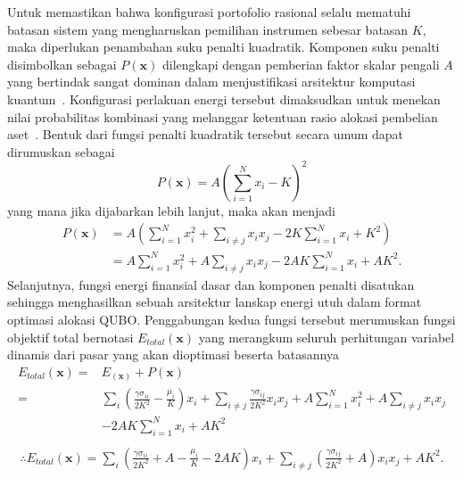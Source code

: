 Untuk memastikan bahwa konfigurasi portofolio rasional selalu mematuhi batasan sistem yang mengharuskan pemilihan instrumen sebesar batasan $K$, maka diperlukan penambahan suku penalti kuadratik. Komponen suku penalti disimbolkan sebagai $P(\mathbf{x})$ dilengkapi dengan pemberian faktor skalar pengali $A$ yang bertindak sangat dominan dalam menjustifikasi arsitektur komputasi kuantum~\cite{suzuki_spin-_2025}. Konfigurasi perlakuan energi tersebut dimaksudkan untuk menekan nilai probabilitas kombinasi yang melanggar ketentuan rasio alokasi pembelian aset~. Bentuk dari fungsi penalti kuadratik tersebut secara umum dapat dirumuskan sebagai
\begin{equation}
    P(\mathbf{x}) = A\left(\sum_{i=1}^N x_i - K\right)^2
    \label{eq:penalty_function}
\end{equation}
yang mana jika dijabarkan lebih lanjut, maka akan menjadi
\begin{equation*}
    \begin{split}
    P(\mathbf{x}) &= A\left(\sum_{i=1}^N x_i^2 + \sum_{i\ne j} x_ix_j - 2K\sum_{i=1}^N x_i + K^2\right) \\
    &= A\sum_{i=1}^N x_i^2 + A\sum_{i\ne j} x_ix_j - 2AK\sum_{i=1}^N x_i + AK^2.
    \end{split}
\end{equation*}
Selanjutnya, fungsi energi finansial dasar dan komponen penalti disatukan sehingga menghasilkan sebuah arsitektur lanskap energi utuh dalam format optimasi alokasi QUBO. Penggabungan kedua fungsi tersebut merumuskan fungsi objektif total bernotasi $E_{total}(\mathbf{x})$ yang merangkum seluruh perhitungan variabel dinamis dari pasar yang akan dioptimasi beserta batasannya
\begin{equation*}
    \begin{split}
    E_{total}(\mathbf{x}) =& E_(\mathbf{x}) + P(\mathbf{x})\\
    =& \sum_i \left(\frac{\gamma \sigma_{ii}}{2K^2} - \frac{\mu_i}{K}\right)x_i + \sum_{i\ne j}\frac{\gamma \sigma_{ij}}{2K^2} x_ix_j  + A\sum_{i=1}^N x_i^2 + A\sum_{i\ne j} x_ix_j \\
    &- 2AK\sum_{i=1}^N x_i + AK^2 \\
    \end{split}
\end{equation*}
\begin{equation}
    \begin{split}
    \therefore E_{total}(\mathbf{x}) = \sum_i \left(\frac{\gamma \sigma_{ii}}{2K^2} + A - \frac{\mu_i}{K} - 2AK\right)x_i + \sum_{i\ne j}\left(\frac{\gamma \sigma_{ij}}{2K^2} + A\right) x_ix_j + AK^2.
    \end{split}
    \label{eq:E_total}
\end{equation}

